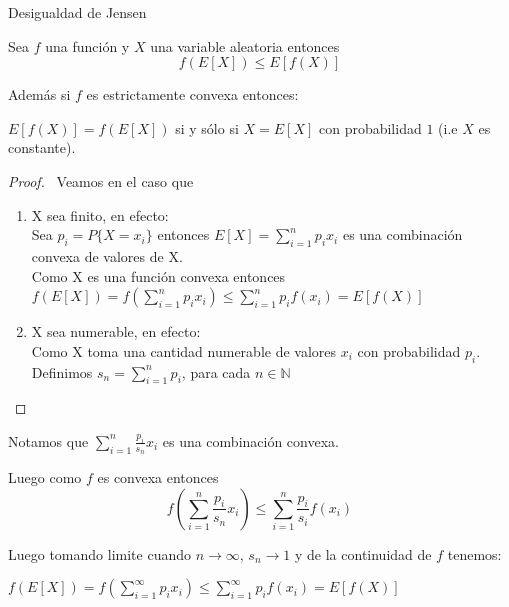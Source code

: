 \documentclass[utf8,spanish,xcolor={table,dvipsnames},12pt]{beamer}
\begin{document}
\begin{frame}{Desigualdad de Jensen}
\begin{theorem}
  Sea $f$ una función y $X$ una variable aleatoria entonces
  $$f(E[X])\leq E[f(X)]$$
  
  \vspace{0.2cm}
  
  Además si $f$ es estrictamente convexa  entonces:
  
  \vspace{0.2cm}
  
  $E[f(X)]=f(E[X])$ si y s\'olo si $X=E[X]$ con probabilidad $1$ (i.e $X$ es constante).
\end{theorem}
\end{frame}

\begin{frame}
\begin{proof}
  \pause\
  Veamos en el caso que
  \pause\
  \begin{enumerate}
    \item X sea finito, en efecto:\\
          Sea $p_{i}=P\{X=x_{i}\}$ entonces $E[X]= \displaystyle \sum_{i=1}^{n}p_{i}x_{i}$ es una combinación convexa de valores de X.\\
          Como X es una función convexa entonces \\
          $f(E[X])=f(\displaystyle \sum_{i=1}^{n}p_{i}x_{i})\leq \sum_{i=1}^{n}p_{i}f(x_{i})=E[f(X)]$
    \pause\ 
    \item X sea numerable, en efecto:\\
     Como X toma una cantidad numerable de valores $x_{i}$ con probabilidad $p_{i}$.\\
     Definimos $s_{n}=\displaystyle\sum_{i=1}^{n}p_{i}$, para cada $n\in \mathds{N}$\\
     \end{enumerate}
     \end{proof}
     \end{frame}

     \begin{frame}{}
       Notamos que $\displaystyle\sum_{i=1}^{n}\frac{p_{i}}{s_{n}}x_{i}$ es una combinación convexa.


     Luego como $f$ es convexa entonces
     \[
      f(\displaystyle\sum_{i=1}^{n}\frac{p_{i}}{s_{n}}x_{i})\leq \displaystyle\sum_{i=1}^{n}\frac{p_{i}}{s_{i}}f(x_{i})
      \]
      
      \vspace{0.2cm}
      
      Luego tomando limite cuando $n\rightarrow \infty$,  $s_{n}\rightarrow 1$ y de la continuidad de $f$ tenemos:
      
      \vspace{0.2cm}
      
      $f(E[X])=f(\displaystyle\sum_{i=1}^{\infty}p_{i}x_{i})\leq \sum_{i=1}^{\infty}p_{i}f(x_{i})=E[f(X)]$
     \end{frame}
\end{document}
